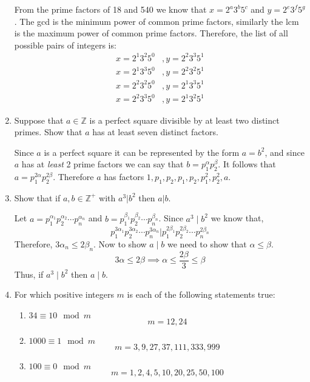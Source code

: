 \documentclass[class=article, crop=false]{standalone}
\def\integers{{\mathbb Z}}
\begin{document}
\begin{enumerate}
  From the prime factors of 18 and 540 we know that $x = 2^a 3^b 5^c$ and $y = 2^e 3^f 5^g$. The gcd is the
  minimum power of common prime factors, similarly the lcm is the maximum power of common prime factors. Therefore,
  the list of all possible pairs of integers is:
  \begin{align*}
	x=2^1 3^2 5^0 &, y=2^2 3^3 5^1 \\
	x=2^1 3^3 5^0 &, y=2^2 3^2 5^1 \\
	x=2^2 3^2 5^0 &, y=2^1 3^3 5^1 \\
	x=2^2 3^3 5^0 &, y=2^1 3^2 5^1
  \end{align*}

\item
  Suppose that $a\in\integers$ is a perfect square
  divisible by at least two distinct primes.
  Show that $a$ has at least seven distinct factors.\hfill{}

  Since $a$ is a perfect square it can be represented by the form $a=b^2$, and since $a$ has 
  at \emph{least} 2 prime factors we can say that $b=p_1^{\alpha} p_2^{\beta}$. 
  It follows that $a=p_1^{2\alpha} p_2^{2\beta}$. Therefore $a$ has factors
  $1, p_1, p_2, p_1, p_2, p_1^2, p_2^2, a$.

\item
  Show that if $a,b\in\integers^+$ with $a^3\big|b^2$ then $a\big|b$.\hfill{}

  Let $a= p_1^{\alpha_1} p_2^{\alpha_2}\cdots p_n^{\alpha_n}$ and $b= p_1^{\beta_1} p_2^{\beta_2}\cdots p_n^{\beta_n}$.
  Since $a^3\mid b^2$ we know that, 
  $$p_1^{3\alpha_1} p_2^{3\alpha_2}\cdots p_n^{3\alpha_n} \Big| p_1^{2\beta_1} p_2^{2\beta_2}\cdots p_n^{2\beta_n}$$
  Therefore, $3\alpha_n \leq 2\beta_n$. Now to show $a\mid b$ we need to show that $\alpha \leq \beta$.
  $$3\alpha\leq 2\beta \implies \alpha \leq \frac{2\beta}{3} \leq \beta$$
  Thus, if $a^3\mid b^2$ then $a\mid b$.

\item For which positive integers $m$ is each of the following statements true:\hfill{}
\begin{enumerate}
\item
  $34\equiv 10 \mod m$ \\
  $$m = 12, 24$$
\item
  $1000\equiv 1 \mod m$ \\
  $$m = 3, 9, 27, 37, 111, 333, 999$$
\item
  $100\equiv 0 \mod m$ \\
  $$m = 1, 2, 4, 5, 10, 20, 25, 50, 100$$
\end{enumerate}

\end{enumerate}
\end{document}
